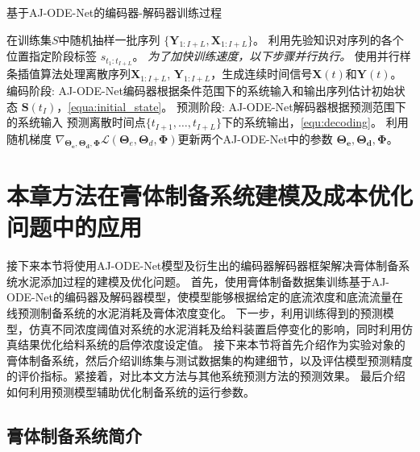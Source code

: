 \begin{algorithm*}[]
\caption{ 基于AJ-ODE-Net的编码器-解码器训练过程 }
\label{alg:training}
\begin{algorithmic}[1]
\State  在训练集$S$中随机抽样一批序列 $\{\boldsymbol{Y}_{1:I+L}, {\boldsymbol {X}}_{1:I+L}\}$。
\State 利用先验知识对序列的各个位置指定阶段标签 $s_{t_1:t_{I+L}}$。
\State \text{//}\textit{为了加快训练速度，以下步骤并行执行。}
\State 使用并行样条插值算法处理离散序列${\boldsymbol {X}}_{1:I+L}$, $\boldsymbol{Y}_{1:I+L}$，生成连续时间信号$\boldsymbol X(t)$和$\boldsymbol Y(t)$。
\State 编码阶段: AJ-ODE-Net编码器根据条件范围下的系统输入和输出序列估计初始状态 $\boldsymbol{S}\left(t_{I}\right)$，\eqref{equa:initial_state}。
\State 预测阶段: AJ-ODE-Net解码器根据预测范围下的系统输入 预测离散时间点$\{t_{I+1}, \dots, t_{I+L}\}$下的系统输出，\eqref{equ:decoding}。
\State 利用随机梯度 $\nabla_{\boldsymbol{\Theta_{e}}, \boldsymbol{\Theta_{d}}, \boldsymbol \Phi}\mathcal{L}\left(\boldsymbol{\Theta}_{e}, \boldsymbol{\Theta}_{d}, \boldsymbol{\Phi}\right)$更新两个AJ-ODE-Net中的参数 $\boldsymbol{\Theta_{e}}, \boldsymbol{\Theta_{d}}, \boldsymbol \Phi$。
\EndFor
\EndFor
\end{algorithmic}
\end{algorithm*}


\section{本章方法在膏体制备系统建模及成本优化问题中的应用}
\label{sec:4_evalutaion}
接下来本节将使用AJ-ODE-Net模型及衍生出的编码器解码器框架解决膏体制备系统水泥添加过程的建模及优化问题。
首先，使用膏体制备数据集训练基于AJ-ODE-Net的编码器及解码器模型，使模型能够根据给定的底流浓度和底流流量在线预测制备系统的水泥消耗及膏体浓度变化。
下一步，利用训练得到的预测模型，仿真不同浓度阈值对系统的水泥消耗及给料装置启停变化的影响，同时利用仿真结果优化给料系统的启停浓度设定值。
接下来本节将首先介绍作为实验对象的膏体制备系统，然后介绍训练集与测试数据集的构建细节，以及评估模型预测精度的评价指标。紧接着，对比本文方法与其他系统预测方法的预测效果。
最后介绍如何利用预测模型辅助优化制备系统的运行参数。


\subsection{膏体制备系统简介}
\label{sec:ecotype_description}

